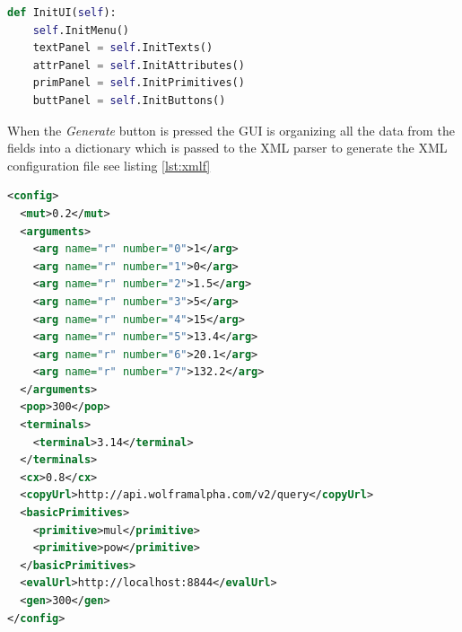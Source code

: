 \begin{lstlisting}[language=Python,caption={The method in the GUI that initializes all the components used},label={lst:guicode}]
def InitUI(self):
    self.InitMenu()
    textPanel = self.InitTexts()
    attrPanel = self.InitAttributes()
    primPanel = self.InitPrimitives()
    buttPanel = self.InitButtons()
\end{lstlisting}

When the \textit{Generate} button is pressed the GUI is organizing all the data from the fields into a dictionary which is passed to the XML parser to generate the XML configuration file see listing \ref{lst:xmlf}

\begin{lstlisting}[language=XML,caption={XML file used by the framework for configuring the needed parameters},label={lst:xmlf}]
<config>
  <mut>0.2</mut>
  <arguments>
    <arg name="r" number="0">1</arg>
    <arg name="r" number="1">0</arg>
    <arg name="r" number="2">1.5</arg>
    <arg name="r" number="3">5</arg>
    <arg name="r" number="4">15</arg>
    <arg name="r" number="5">13.4</arg>
    <arg name="r" number="6">20.1</arg>
    <arg name="r" number="7">132.2</arg>
  </arguments>
  <pop>300</pop>
  <terminals>
    <terminal>3.14</terminal>
  </terminals>
  <cx>0.8</cx>
  <copyUrl>http://api.wolframalpha.com/v2/query</copyUrl>
  <basicPrimitives>
    <primitive>mul</primitive>
    <primitive>pow</primitive>
  </basicPrimitives>
  <evalUrl>http://localhost:8844</evalUrl>
  <gen>300</gen>
</config>
\end{lstlisting}

